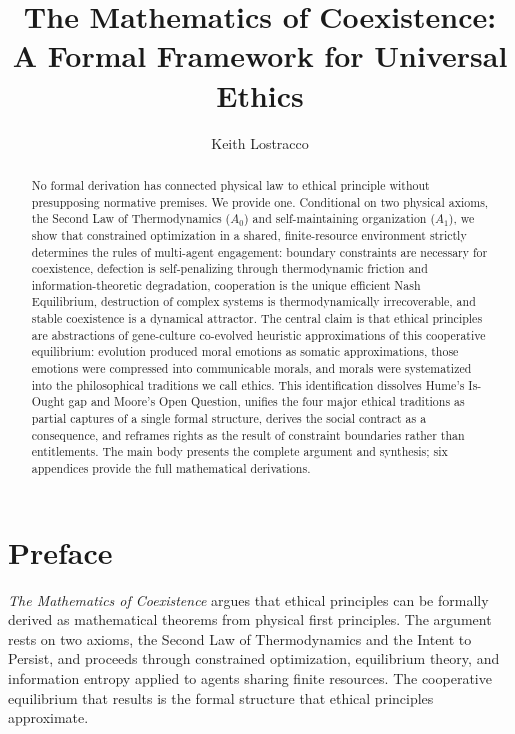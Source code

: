 \documentclass[11pt]{article}
\title{The Mathematics of Coexistence: A Formal Framework for Universal
Ethics}
\author{%
Keith Lostracco%
}
\date{}
\theoremstyle{plain}
\theoremstyle{definition}
\theoremstyle{remark}
\let\origsection\section
\renewcommand{\section}{\needspace{12\baselineskip}\origsection}
\begin{document}
\maketitle

\begin{abstract}
No formal derivation has connected physical law to ethical principle
without presupposing normative premises. We provide one. Conditional on
two physical axioms, the Second Law of Thermodynamics (\(A_0\)) and
self-maintaining organization (\(A_1\)), we show that constrained
optimization in a shared, finite-resource environment strictly
determines the rules of multi-agent engagement: boundary constraints are
necessary for coexistence, defection is self-penalizing through
thermodynamic friction and information-theoretic degradation,
cooperation is the unique efficient Nash Equilibrium, destruction of
complex systems is thermodynamically irrecoverable, and stable
coexistence is a dynamical attractor. The central claim is that ethical
principles are abstractions of gene-culture co-evolved heuristic
approximations of this cooperative equilibrium: evolution produced moral
emotions as somatic approximations, those emotions were compressed into
communicable morals, and morals were systematized into the philosophical
traditions we call ethics. This identification dissolves Hume's Is-Ought
gap and Moore's Open Question, unifies the four major ethical traditions
as partial captures of a single formal structure, derives the social
contract as a consequence, and reframes rights as the result of
constraint boundaries rather than entitlements. The main body presents
the complete argument and synthesis; six appendices provide the full
mathematical derivations.
\end{abstract}
\newpage
\tableofcontents
\newpage
\section*{Preface}\label{preface}

\emph{The Mathematics of Coexistence} argues that ethical principles can
be formally derived as mathematical theorems from physical first
principles. The argument rests on two axioms, the Second Law of
Thermodynamics and the Intent to Persist, and proceeds through
constrained optimization, equilibrium theory, and information entropy
applied to agents sharing finite resources. The cooperative equilibrium
that results is the formal structure that ethical principles
approximate.
\end{document}
